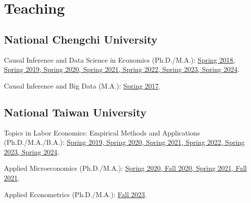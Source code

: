 \documentclass[10pt,letterpaper]{article}
\renewenvironment{itemize}{
  \begin{list}{}{
      \setlength{\leftmargin}{1.5em}
      \setlength{\itemsep}{0.25em}
      \setlength{\parskip}{0pt}
      \setlength{\parsep}{0.25em}
    }
}{
  \end{list}
}
\begin{document}
\section*{\textbf{Teaching}}

\subsection*{National Chengchi University}

\begin{itemize}
\item Causal Inference and Data Science in Economics (Ph.D./M.A.):
  \href{https://causaldatalab.wordpress.com/teaching/}{Spring 2018, Spring 2019, Spring 2020, Spring 2021, Spring 2022, Spring 2023, Spring 2024}. %
\item Causal Inference and Big Data (M.A.):
  \href{https://causaldatalab.wordpress.com/2017/02/24/causal-inference-and-big-data-spring-2017/}{Spring 2017}. %
\end{itemize}


\subsection*{National Taiwan University}

\begin{itemize}
	\item Topics in Labor Economics: Empirical Methods and Applications  (Ph.D./M.A./B.A.):
	\href{https://sites.google.com/view/cpelab/teaching?authuser=0}{Spring 2019, Spring 2020, Spring 2021, Spring 2022, Spring 2023, Spring 2024}. %
	\item Applied Microeconomics  (Ph.D./M.A.):
	\href{https://sites.google.com/view/cpelab/teaching?authuser=0}{Spring 2020, Fall 2020, Spring 2021, Fall 2021}.
		\item Applied Econometrics  (Ph.D./M.A.):
	\href{https://causaldatalab.wordpress.com/teaching/}{Fall 2023}.

	
\end{itemize}
\end{document}
